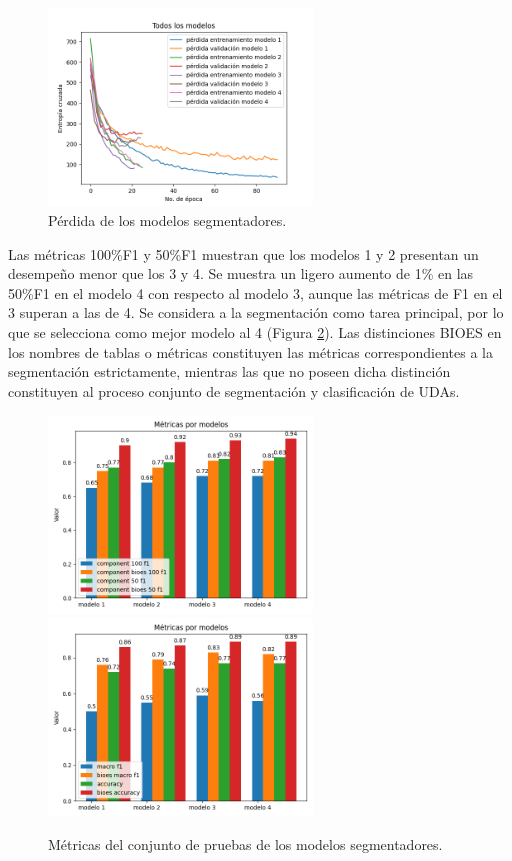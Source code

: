 \documentclass[a4paper,11pt,twocolumn,twoside]{article}
\begin{document}
\begin{figure}[h]
	\centering
	\includegraphics[width=7cm,clip]{Graphics/persuasive_essays_all_linked_crf_loss.png}
	\caption{Pérdida de los modelos segmentadores.}
	\label{fig:segmenter_model_loss}
\end{figure}

Las métricas 100\%F1 y 50\%F1 muestran que los modelos 1 y 2 presentan un desempeño menor que los 3 y 4. 
Se muestra un ligero aumento de 1\% en las 50\%F1 en el modelo 4 con respecto 
al modelo 3, aunque las métricas de F1 en el 3 superan a las de 4. Se considera a la 
segmentación como tarea principal, por lo que se selecciona como mejor modelo al 4 (Figura \ref{fig:test_segmenter_model_metrics}).
Las distinciones BIOES en los nombres de tablas o métricas constituyen las métricas correspondientes 
a la segmentación estrictamente, mientras las que no poseen dicha distinción constituyen al proceso 
conjunto de segmentación y clasificación de UDAs. 

\begin{figure}[h]
	\centering
	\includegraphics[width=7cm,clip]{Graphics/persuasive_essays_all_linked_components.png}
	\includegraphics[width=7cm,clip]{Graphics/persuasive_essays_all_linked_macro_micro_metrics.png}
	\caption{Métricas del conjunto de pruebas de los modelos segmentadores.}
	\label{fig:test_segmenter_model_metrics}
\end{figure}
\end{document}
